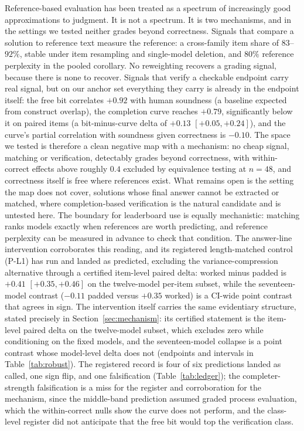 Reference-based evaluation has been treated as a spectrum of increasingly good approximations to judgment.
It is not a spectrum.
It is two mechanisms, and in the settings we tested neither grades beyond correctness.
Signals that compare a solution to reference text measure the reference: a cross-family item share of $83$--$92\%$, stable under item resampling and single-model deletion, and $80\%$ reference perplexity in the pooled corollary.
No reweighting recovers a grading signal, because there is none to recover.
Signals that verify a checkable endpoint carry real signal, but on our anchor set everything they carry is already in the endpoint itself: the free bit correlates $+0.92$ with human soundness (a baseline expected from construct overlap), the completion curve reaches $+0.79$, significantly below it on paired items (a bit-minus-curve delta of $+0.13$ $[+0.05, +0.24]$), and the curve's partial correlation with soundness given correctness is $-0.10$.
The space we tested is therefore a clean negative map with a mechanism: no cheap signal, matching or verification, detectably grades beyond correctness, with within-correct effects above roughly $0.4$ excluded by equivalence testing at $n{=}48$, and correctness itself is free where references exist.
What remains open is the setting the map does not cover, solutions whose final answer cannot be extracted or matched, where completion-based verification is the natural candidate and is untested here.
The boundary for leaderboard use is equally mechanistic: matching ranks models exactly when references are worth predicting, and reference perplexity can be measured in advance to check that condition.
The answer-line intervention corroborates this reading, and its registered length-matched control (P-L1) has run and landed as predicted, excluding the variance-compression alternative through a certified item-level paired delta: worked minus padded is $+0.41$ $[+0.35, +0.46]$ on the twelve-model per-item subset, while the seventeen-model contrast ($-0.11$ padded versus $+0.35$ worked) is a CI-wide point contrast that agrees in sign.
The intervention itself carries the same evidentiary structure, stated precisely in Section~\ref{sec:mechanism}: its certified statement is the item-level paired delta on the twelve-model subset, which excludes zero while conditioning on the fixed models, and the seventeen-model collapse is a point contrast whose model-level delta does not (endpoints and intervals in Table~\ref{tab:robust}).
The registered record is four of six predictions landed as called, one sign flip, and one falsification (Table~\ref{tab:ledger}); the completer-strength falsification is a miss for the register and corroboration for the mechanism, since the middle-band prediction assumed graded process evaluation, which the within-correct nulls show the curve does not perform, and the class-level register did not anticipate that the free bit would top the verification class.
